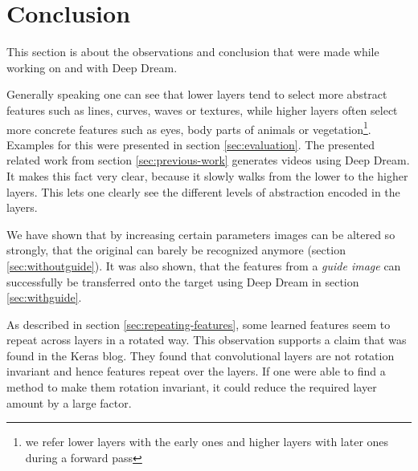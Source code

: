 \section{Conclusion}
\label{sec:conclusion}
This section is about the observations and conclusion that were made while working on and with Deep Dream.

Generally speaking one can see that lower layers tend to select more abstract features such as lines, curves, waves or textures, while higher layers often select more concrete features such as eyes, body parts of animals or vegetation\footnote{we refer lower layers with the early ones and higher layers with later ones during a forward pass}.
Examples for this were presented in section \ref{sec:evaluation}.
The presented related work from section \ref{sec:previous-work} generates videos using Deep Dream.
It makes this fact very clear, because it slowly walks from the lower to the higher layers.
This lets one clearly see the different levels of abstraction encoded in the layers.

We have shown that by increasing certain parameters images can be altered so strongly, that the original can barely be recognized anymore (section \ref{sec:withoutguide}).
It was also shown, that the features from a \emph{guide image} can successfully be transferred onto the target using Deep Dream in section \ref{sec:withguide}.

As described in section \ref{sec:repeating-features}, some learned features seem to repeat across layers in a rotated way.
This observation supports a claim that was found in the Keras blog.\cite{keras-blog}
They found that convolutional layers are not rotation invariant and hence features repeat over the layers.
If one were able to find a method to make them rotation invariant, it could reduce the required layer amount by a large factor.
